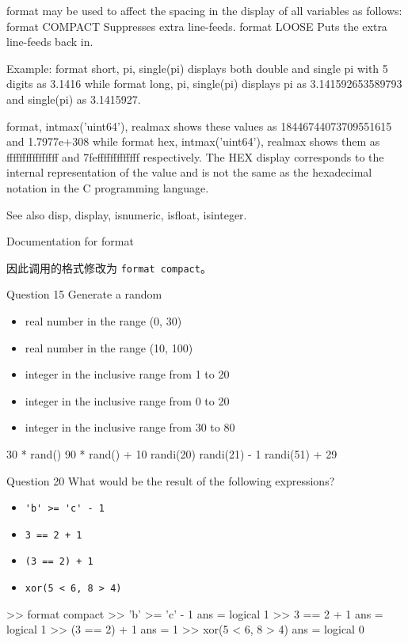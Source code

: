 \begin{matlab}{}
    format may be used to affect the spacing in the display of all
    variables as follows:
      format COMPACT Suppresses extra line-feeds.
      format LOOSE   Puts the extra line-feeds back in.
 
    Example:
       format short, pi, single(pi)
    displays both double and single pi with 5 digits as 3.1416 while
       format long, pi, single(pi)
    displays pi as 3.141592653589793 and single(pi) as 3.1415927.
 
       format, intmax('uint64'), realmax
    shows these values as 18446744073709551615 and 1.7977e+308 while
       format hex, intmax('uint64'), realmax
    shows them as ffffffffffffffff and 7fefffffffffffff respectively.
    The HEX display corresponds to the internal representation of the value
    and is not the same as the hexadecimal notation in the C programming
    language.
 
    See also disp, display, isnumeric, isfloat, isinteger.

    Documentation for format
\end{matlab}
因此调用的格式修改为 \verb|format compact|。


\begin{statebox}{Question 15}{}
    Generate a random
    \begin{itemize}
        \item real number in the range (0, 30)
        \item real number in the range (10, 100)
        \item integer in the inclusive range from 1 to 20
        \item integer in the inclusive range from 0 to 20
        \item integer in the inclusive range from 30 to 80
    \end{itemize}
\end{statebox}
\begin{matlab}{}
30 * rand()
90 * rand() + 10
randi(20)
randi(21) - 1
randi(51) + 29
\end{matlab}


\begin{statebox}{Question 20}{}
    What would be the result of the following expressions?
    \begin{itemize}
        \item \verb|'b' >= 'c' - 1|
        \item \verb|3 == 2 + 1|
        \item \verb|(3 == 2) + 1|
        \item \verb|xor(5 < 6, 8 > 4)|
    \end{itemize}
\end{statebox}
\begin{matlab}{}
>> format compact
>> 'b' >= 'c' - 1
ans =
  logical
   1
>> 3 == 2 + 1
ans =
  logical
   1
>> (3 == 2) + 1
ans =
     1
>> xor(5 < 6, 8 > 4)
ans =
  logical
   0
\end{matlab}


